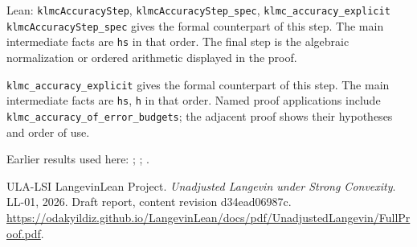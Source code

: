 \documentclass[11pt,a4paper]{article}
\begin{document}
\begin{leanbox}{Lean: \texttt{klmcAccuracyStep}, \texttt{klmcAccuracyStep\_\allowbreak{}spec}, \texttt{klmc\_\allowbreak{}accuracy\_\allowbreak{}explicit}}
\texttt{klmc\allowbreak{}Accuracy\allowbreak{}Step\_\allowbreak{}spec} gives the formal counterpart of this step. The main intermediate facts are \texttt{hs} in that order. The final step is the algebraic normalization or ordered arithmetic displayed in the proof.




\texttt{klmc\_\allowbreak{}accuracy\_\allowbreak{}explicit} gives the formal counterpart of this step. The main intermediate facts are \texttt{hs}, \texttt{h} in that order. Named proof applications include \texttt{klmc\_\allowbreak{}accuracy\_\allowbreak{}of\_\allowbreak{}error\_\allowbreak{}budgets}; the adjacent proof shows their hypotheses and order of use.
\end{leanbox}


Earlier results used here: \cite[Section~3.17.3]{LangevinLean2026ULASC}; \cite[Section~3.17.4]{LangevinLean2026ULASC}; \cite[Section~3.26.3]{LangevinLean2026ULASC}.

\begin{thebibliography}{ULA-LSI}
LangevinLean Project. \emph{Unadjusted Langevin under Strong Convexity}. LL-01, 2026. Draft report, content revision d34ead06987c. \url{https://odakyildiz.github.io/LangevinLean/docs/pdf/UnadjustedLangevin/FullProof.pdf}.
\end{thebibliography}
\end{document}

